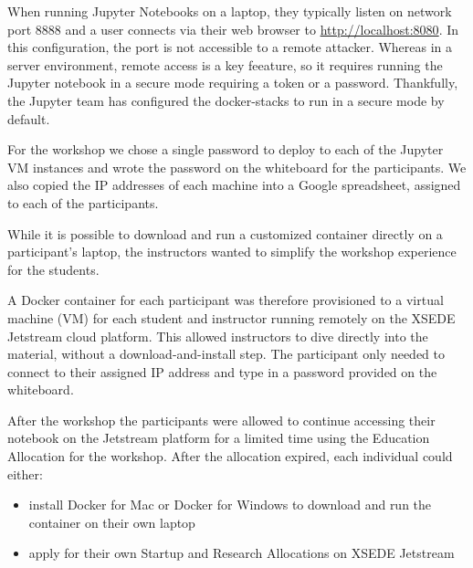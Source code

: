 When running Jupyter Notebooks on a laptop, they typically listen on network
port 8888 and a user connects via their web browser to
\url{http://localhost:8080}. In this configuration, the port is not accessible
to a remote attacker. Whereas in a server environment, remote access is a key
feeature, so it requires running the Jupyter notebook in a secure mode requiring
a token or a password. Thankfully, the Jupyter team has configured the
docker-stacks to run in a secure mode by default.

For the workshop we chose a single password to deploy to each of the Jupyter VM
instances and wrote the password on the whiteboard for the participants. We also
copied the IP addresses of each machine into a Google spreadsheet, assigned to
each of the participants.

While it is possible to download and run a customized container directly on a
participant’s laptop, the instructors wanted to simplify the workshop
experience for the students.

A Docker container for each participant was therefore provisioned to
a virtual machine (VM) for each student and instructor running remotely on the
XSEDE Jetstream cloud platform. This allowed instructors to dive directly into
the material, without a download-and-install step. The participant only needed
to connect to their assigned IP address and type in a password provided on the
whiteboard.

After the workshop the participants were allowed to continue accessing their
notebook on the Jetstream platform for a limited time using the Education
Allocation for the workshop. After the allocation expired, each individual could
either:

\begin{itemize}

\item install Docker for Mac or Docker for Windows to download and run the
container on their own laptop

\item apply for their own Startup and Research Allocations on XSEDE Jetstream

\end{itemize}
